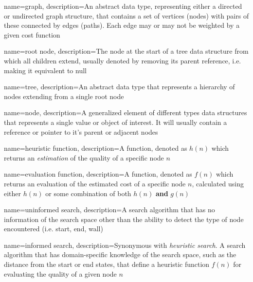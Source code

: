 
{
	name=graph,
	description={An abstract data type, representing either a \gls{directed} or \gls{undirected} graph structure, that contains a set of vertices (nodes) with pairs of these connected by edges (paths). Each edge may or may not be weighted by a given cost function}
}

{
	name={root node},
	description={The node at the start of a tree data structure from which all children extend, usually denoted by removing its parent reference, i.e. making it equivalent to null}
}

{
	name=tree,
	description={An abstract data type that represents a hierarchy of \glspl{node} extending from a single \gls{root} node}
}

{
	name=node,
	description={A generalized element of different types data structures that represents a single value or object of interest. It will usually contain a reference or pointer to it's parent or adjacent nodes}
}

{
	name={heuristic function},
	description={A function, denoted as $h(n)$ which returns an \textit{estimation} of the quality of a specific node $n$}
}

{
	name={evaluation function},
	description={A function, denoted as $f(n)$ which returns an evaluation of the estimated cost of a specific node $n$, calculated using either $h(n)$ or some combination of both $h(n)$ \textbf{and} $g(n)$}
}

{
	name={uninformed search},
	description={A search algorithm that has no information of the search space other than the ability to detect the type of node encountered (i.e. start, end, wall)}
}

{
	name={informed search},
	description={Synonymous with \textit{heuristic search}. A search algorithm that has domain-specific knowledge of the search space, such as the distance from the start or end states, that define a \gls{heuristic} function $f(n)$ for evaluating the quality of a given node $n$}
}

